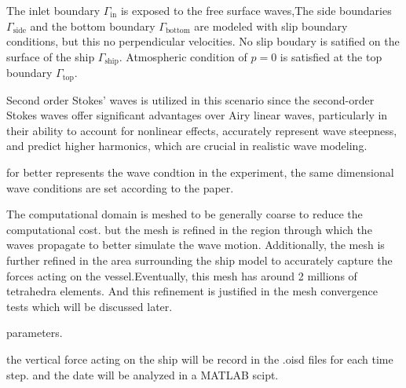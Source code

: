 \documentclass[17pt]{extarticle} %
\begin{document}
The inlet boundary \(\Gamma_{\text{in}}\) is exposed to the free surface waves,The side boundaries \(\Gamma_{\text{side}}\) and the bottom boundary 
\(\Gamma_{\text{bottom}}\) are modeled with slip boundary conditions, but this no perpendicular velocities.
No slip boudary is satified on the surface of the ship \(\Gamma_{\text{ship}}\). 
Atmospheric condition of \(p = 0\) is satisfied at the top boundary \(\Gamma_{\text{top}}\).

Second order Stokes' waves is utilized in this scenario since the second-order Stokes waves offer significant advantages over Airy linear 
waves, particularly in their ability to account for nonlinear effects,  accurately represent wave 
steepness, and predict higher harmonics, which are crucial in realistic wave modeling.

for better represents the wave condtion in the experiment, the same dimensional wave conditions are set according to the paper.

The computational domain is meshed to be generally coarse to reduce the computational cost.
but the mesh is refined in the region through which the waves 
propagate to better simulate the wave motion. Additionally, the mesh is further refined in the area surrounding 
the ship model to accurately capture the forces acting on the vessel.Eventually, this mesh has around 2 millions of tetrahedra elements.
And this refinement is justified in the mesh convergence tests which will be discussed later.

parameters.

the vertical force acting on the ship will be record in the .oisd files for each time step.
and the date will be analyzed in a MATLAB scipt.
\end{document}
